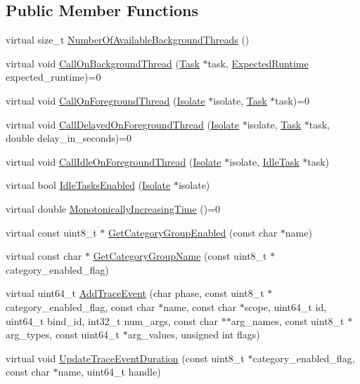 \subsection*{Public Member Functions}
\begin{DoxyCompactItemize}
\item 
virtual size\+\_\+t \hyperlink{classv8_1_1_platform_a15886ccf5a6a085a2192b305709a527c}{Number\+Of\+Available\+Background\+Threads} ()
\item 
virtual void \hyperlink{classv8_1_1_platform_aa715e6839c1954b4e23b9d2df00bd3ea}{Call\+On\+Background\+Thread} (\hyperlink{classv8_1_1_task}{Task} $\ast$task, \hyperlink{classv8_1_1_platform_ace7f666b2b5995bb0e898e12fa660718}{Expected\+Runtime} expected\+\_\+runtime)=0
\item 
virtual void \hyperlink{classv8_1_1_platform_a8fa13959f919d1d3ff170bceea939915}{Call\+On\+Foreground\+Thread} (\hyperlink{classv8_1_1_isolate}{Isolate} $\ast$isolate, \hyperlink{classv8_1_1_task}{Task} $\ast$task)=0
\item 
virtual void \hyperlink{classv8_1_1_platform_a72bff12d95fbf2118279b0e8f53f8a4b}{Call\+Delayed\+On\+Foreground\+Thread} (\hyperlink{classv8_1_1_isolate}{Isolate} $\ast$isolate, \hyperlink{classv8_1_1_task}{Task} $\ast$task, double delay\+\_\+in\+\_\+seconds)=0
\item 
virtual void \hyperlink{classv8_1_1_platform_ae495999016432391f04d323452084b12}{Call\+Idle\+On\+Foreground\+Thread} (\hyperlink{classv8_1_1_isolate}{Isolate} $\ast$isolate, \hyperlink{classv8_1_1_idle_task}{Idle\+Task} $\ast$task)
\item 
virtual bool \hyperlink{classv8_1_1_platform_ad229642bf16a066d2e8d866dc128141e}{Idle\+Tasks\+Enabled} (\hyperlink{classv8_1_1_isolate}{Isolate} $\ast$isolate)
\item 
virtual double \hyperlink{classv8_1_1_platform_a6d4d7c2dcf6b0c7113099b97fa7f57b7}{Monotonically\+Increasing\+Time} ()=0
\item 
virtual const uint8\+\_\+t $\ast$ \hyperlink{classv8_1_1_platform_a5b81982481986c80d3f613dde54494da}{Get\+Category\+Group\+Enabled} (const char $\ast$name)
\item 
virtual const char $\ast$ \hyperlink{classv8_1_1_platform_a02dde4138b387f1ae2b53190cdac2afc}{Get\+Category\+Group\+Name} (const uint8\+\_\+t $\ast$category\+\_\+enabled\+\_\+flag)
\item 
virtual uint64\+\_\+t \hyperlink{classv8_1_1_platform_ab4ef5713fb5bec0f2fe0981745342364}{Add\+Trace\+Event} (char phase, const uint8\+\_\+t $\ast$category\+\_\+enabled\+\_\+flag, const char $\ast$name, const char $\ast$scope, uint64\+\_\+t id, uint64\+\_\+t bind\+\_\+id, int32\+\_\+t num\+\_\+args, const char $\ast$$\ast$arg\+\_\+names, const uint8\+\_\+t $\ast$arg\+\_\+types, const uint64\+\_\+t $\ast$arg\+\_\+values, unsigned int flags)
\item 
virtual void \hyperlink{classv8_1_1_platform_aa7ead571c0b19687635a930d9c67b73b}{Update\+Trace\+Event\+Duration} (const uint8\+\_\+t $\ast$category\+\_\+enabled\+\_\+flag, const char $\ast$name, uint64\+\_\+t handle)
\end{DoxyCompactItemize}


